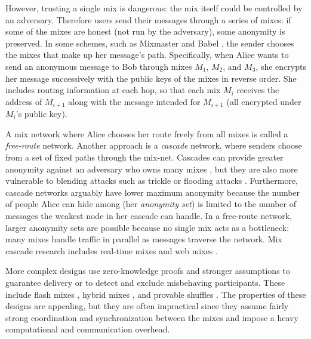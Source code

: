 \documentclass[final,inpress,inline]{ieee}
\begin{document}
However, trusting a single mix is dangerous: the mix itself could be
controlled by an adversary. Therefore users send their messages through
a series of mixes: if some of the mixes are honest (not run by the
adversary),
some anonymity is preserved. In some schemes, such as Mixmaster
\cite{mixmaster-spec} and Babel \cite{babel}, the sender chooses the
mixes that make up her message's path. Specifically, when Alice
wants to send an anonymous message to Bob through mixes $M_1$, $M_2$,
and $M_3$, she encrypts her message successively with the public keys of
the mixes in reverse order. She includes routing information at each hop,
so that each mix $M_i$ receives the address of $M_{i+1}$ along with the
message intended for $M_{i+1}$ (all encrypted under $M_i$'s public key).

A mix network where Alice chooses her route freely from all mixes is
called a \emph{free-route} network. Another approach is a \emph{cascade}
network, where senders choose from a set of fixed paths through the
mix-net. Cascades can provide greater anonymity against an adversary
who owns many mixes \cite{disad-free-routes}, but they are also more
vulnerable to blending attacks such as trickle or flooding attacks
\cite{batching-taxonomy}.
Furthermore, cascade networks arguably have lower maximum anonymity because
the number of people Alice can hide among (her \emph{anonymity set}) is limited
to the number of messages the weakest node in her cascade can handle.
In a free-route network, larger anonymity sets are possible because no
single mix acts as a bottleneck: many mixes handle traffic in parallel as
messages traverse the network.
Mix cascade research includes real-time
mixes \cite{realtime-mix} and web mixes \cite{web-mix}.

More complex designs use zero-knowledge proofs and stronger assumptions
to guarantee delivery or to detect and exclude misbehaving participants.
These include flash mixes \cite{flash-mix},
hybrid mixes \cite{jakobsson-optimally}\cite{hybrid-mix},
and provable shuffles \cite{PShuffle}\cite{shuffle}. The properties
of these designs are appealing, but they are often impractical since
they assume fairly strong coordination and synchronization between the mixes
and impose a heavy computational and communication overhead.
\end{document}

